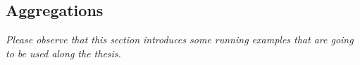 
%
%
%
%

\subsection{Aggregations}\label{sec:informationsintegration}
\textit{Please observe that this section introduces some running examples that are going to be used along the thesis.}

